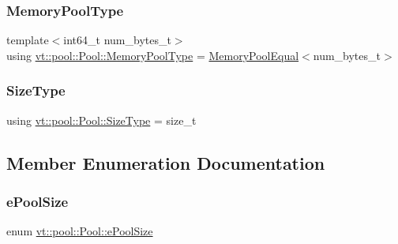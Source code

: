 \subsubsection{\texorpdfstring{Memory\+Pool\+Type}{MemoryPoolType}}
{\footnotesize\ttfamily template$<$int64\+\_\+t num\+\_\+bytes\+\_\+t$>$ \\
using \hyperlink{structvt_1_1pool_1_1_pool_a06673914350d933ad5205155eca14a3b}{vt\+::pool\+::\+Pool\+::\+Memory\+Pool\+Type} =  \hyperlink{structvt_1_1pool_1_1_memory_pool_equal}{Memory\+Pool\+Equal}$<$num\+\_\+bytes\+\_\+t$>$}

\mbox{\label{structvt_1_1pool_1_1_pool_a4030898e09d0160c24743a7b949c0d46}} 
\subsubsection{\texorpdfstring{Size\+Type}{SizeType}}
{\footnotesize\ttfamily using \hyperlink{structvt_1_1pool_1_1_pool_a4030898e09d0160c24743a7b949c0d46}{vt\+::pool\+::\+Pool\+::\+Size\+Type} =  size\+\_\+t}



\subsection{Member Enumeration Documentation}
\mbox{\label{structvt_1_1pool_1_1_pool_ace8d36439e5e599a8ee68b2f1a6a6b28}} 
\subsubsection{\texorpdfstring{e\+Pool\+Size}{ePoolSize}}
{\footnotesize\ttfamily enum \hyperlink{structvt_1_1pool_1_1_pool_ace8d36439e5e599a8ee68b2f1a6a6b28}{vt\+::pool\+::\+Pool\+::e\+Pool\+Size}\hspace{0.3cm}{\ttfamily [strong]}}

